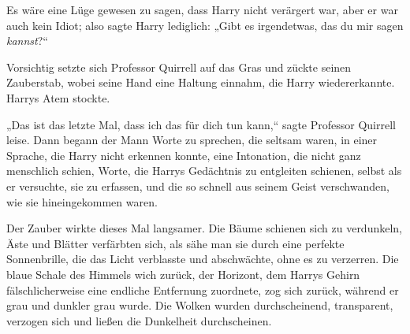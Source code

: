 Es wäre eine Lüge gewesen zu sagen, dass Harry nicht verärgert war, aber er war auch kein Idiot; also sagte Harry lediglich: „Gibt es irgendetwas, das du mir sagen \emph{kannst}?“

Vorsichtig setzte sich Professor Quirrell auf das Gras und zückte seinen Zauberstab, wobei seine Hand eine Haltung einnahm, die Harry wiedererkannte. Harrys Atem stockte.

„Das ist das letzte Mal, dass ich das für dich tun kann,“ sagte Professor Quirrell leise. Dann begann der Mann Worte zu sprechen, die seltsam waren, in einer Sprache, die Harry nicht erkennen konnte, eine Intonation, die nicht ganz menschlich schien, Worte, die Harrys Gedächtnis zu entgleiten schienen, selbst als er versuchte, sie zu erfassen, und die so schnell aus seinem Geist verschwanden, wie sie hineingekommen waren.

Der Zauber wirkte dieses Mal langsamer. Die Bäume schienen sich zu verdunkeln, Äste und Blätter verfärbten sich, als sähe man sie durch eine perfekte Sonnenbrille, die das Licht verblasste und abschwächte, ohne es zu verzerren. Die blaue Schale des Himmels wich zurück, der Horizont, dem Harrys Gehirn fälschlicherweise eine endliche Entfernung zuordnete, zog sich zurück, während er grau und dunkler grau wurde. Die Wolken wurden durchscheinend, transparent, verzogen sich und ließen die Dunkelheit durchscheinen.


